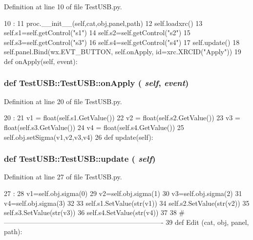 Definition at line 10 of file TestUSB.py.


\begin{DoxyCode}
10                                              :
11         proc.__init__(self,cat,obj,panel,path)
12         self.loadxrc()
13         self.s1=self.getControl("s1")
14         self.s2=self.getControl("s2")
15         self.s3=self.getControl("s3")
16         self.s4=self.getControl("s4")
17         self.update()
18         self.panel.Bind(wx.EVT_BUTTON, self.onApply, id=xrc.XRCID("Apply"))
19 
    def onApply(self, event):
\end{DoxyCode}
\hypertarget{classTestUSB_1_1TestUSB_a0dc8c506a09d50d93fbfd9bad58d11d4}{
\subsubsection[{onApply}]{\setlength{\rightskip}{0pt plus 5cm}def TestUSB::TestUSB::onApply ( {\em self}, \/   {\em event})}}
\label{classTestUSB_1_1TestUSB_a0dc8c506a09d50d93fbfd9bad58d11d4}


Definition at line 20 of file TestUSB.py.


\begin{DoxyCode}
20                             :
21         v1 = float(self.s1.GetValue())
22         v2 = float(self.s2.GetValue())
23         v3 = float(self.s3.GetValue())
24         v4 = float(self.s4.GetValue())
25         self.obj.setSigma(v1,v2,v3,v4)
26 
    def update(self):
\end{DoxyCode}
\hypertarget{classTestUSB_1_1TestUSB_a06ebe37772fabab427b7dd89a192f12d}{
\subsubsection[{update}]{\setlength{\rightskip}{0pt plus 5cm}def TestUSB::TestUSB::update ( {\em self})}}
\label{classTestUSB_1_1TestUSB_a06ebe37772fabab427b7dd89a192f12d}


Definition at line 27 of file TestUSB.py.


\begin{DoxyCode}
27                     :
28         v1=self.obj.sigma(0)
29         v2=self.obj.sigma(1)
30         v3=self.obj.sigma(2)
31         v4=self.obj.sigma(3)
32 
33         self.s1.SetValue(str(v1))
34         self.s2.SetValue(str(v2))
35         self.s3.SetValue(str(v3))
36         self.s4.SetValue(str(v4))        
37 
38 #----------------------------------------------------------------------
39 
def Edit (cat, obj, panel, path):
\end{DoxyCode}


